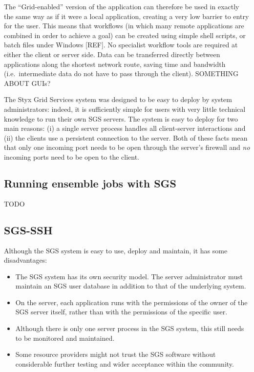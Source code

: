 \documentclass[a4paper]{article}
\begin{document}
\begin{multicols}{2}
The ``Grid-enabled'' version of the application can therefore be used in exactly the same way as if it were a local application, creating a very low barrier to entry for the user.  This means that workflows (in which many remote applications are combined in order to achieve a goal) can be created using simple shell scripts, or batch files under Windows [REF].  No specialist workflow tools are required at either the client or server side.  Data can be transferred directly between applications along the shortest network route, saving time and bandwidth (i.e.\ intermediate data do not have to pass through the client).  SOMETHING ABOUT GUIs?

The Styx Grid Services system was designed to be easy to deploy by system administrators: indeed, it is sufficiently simple for users with very little technical knowledge to run their own SGS servers.  The system is easy to deploy for two main reasons: (i) a single server process handles all client-server interactions and (ii) the clients use a persistent connection to the server.  Both of these facts mean that only one incoming port needs to be open through the server's firewall and {\em no\/} incoming ports need to be open to the client.

\subsection{Running ensemble jobs with SGS}
TODO

\subsection{SGS-SSH}
Although the SGS system is easy to use, deploy and maintain, it has some disadvantages:

\begin{itemize}
\item The SGS system has its own security model.  The server administrator must maintain an SGS user database in addition to that of the underlying system.
\item On the server, each application runs with the permissions of the owner of the SGS server itself, rather than with the permissions of the specific user.
\item Although there is only one server process in the SGS system, this still needs to be monitored and maintained.
\item Some resource providers might not trust the SGS software without considerable further testing and wider acceptance within the community.
\end{itemize}


\end{multicols}
\end{document}
